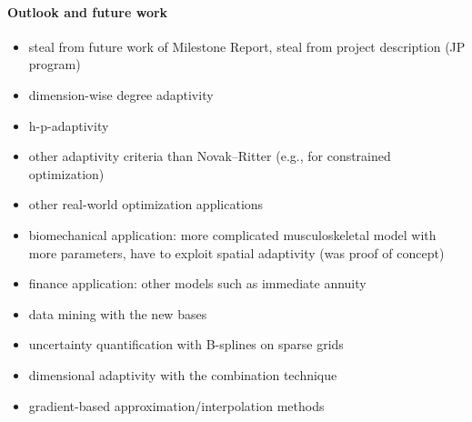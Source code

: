 \dummytext[5]{}

\paragraph{Outlook and future work}


\begin{itemize}
  \item
  steal from future work of Milestone Report,
  steal from project description (JP program)
  
  \item
  dimension-wise degree adaptivity
  
  \item
  h-p-adaptivity
  
  \item
  other adaptivity criteria than Novak--Ritter
  (e.g., for constrained optimization)
  
  \item
  other real-world optimization applications
  
  \item
  biomechanical application: more complicated musculoskeletal model
  with more parameters, have to exploit spatial adaptivity
  (was proof of concept)
  
  \item
  finance application: other models such as immediate annuity
  
  \item
  data mining with the new bases
  
  \item
  uncertainty quantification with B-splines on sparse grids
  
  \item
  dimensional adaptivity with the combination technique
  
  \item
  gradient-based approximation/interpolation methods
\end{itemize}

\dummytext[5]{}

\cleardoublepage
